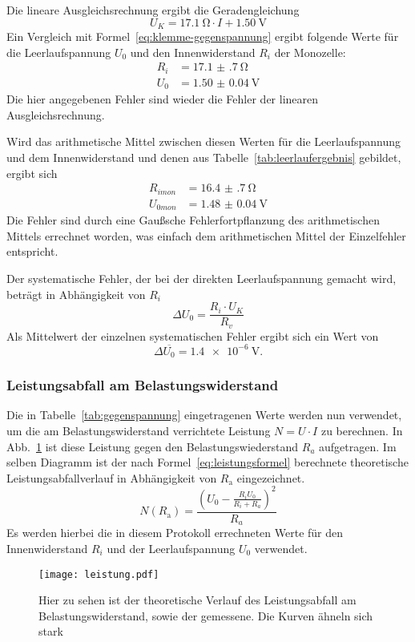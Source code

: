 Die lineare Ausgleichsrechnung ergibt die Geradengleichung
\begin{equation}
U_{K} = \SI{17.1}{\ohm}\cdot I + \SI{1.50}{\volt}
\end{equation}
Ein Vergleich mit Formel~\eqref{eq:klemme-gegenspannung} ergibt folgende 
Werte für die Leerlaufspannung $U_{0}$ und den 
Innenwiderstand $R_{i}$ der Monozelle:
\begin{align*}
R_{i}&=\SI{17.1(7)}{\ohm}\\
U_{0}&=\SI{1.50(4)}{\volt}
\end{align*}
Die hier angegebenen Fehler sind wieder die Fehler der linearen 
Ausgleichsrechnung.

Wird das arithmetische Mittel zwischen diesen 
Werten für die Leerlaufspannung und dem Innenwiderstand 
und denen aus Tabelle~\ref{tab:leerlaufergebnis} gebildet, 
ergibt sich 
\begin{align*}
R_{imon}&=\SI{16.4(7)}{\ohm}\\
U_{0mon}&=\SI{1.48(4)}{\volt}
\end{align*}
Die Fehler sind durch eine Gaußsche Fehlerfortpflanzung des arithmetischen 
Mittels errechnet worden, was einfach dem arithmetischen Mittel der 
Einzelfehler entspricht.


Der systematische Fehler, der bei der direkten Leerlaufspannung 
gemacht wird, beträgt in Abhängigkeit von $R_{i}$
\begin{equation*}
\Delta U_{0} = \frac{R_{i}\cdot U_{K}}{R_{v}}
\end{equation*}
Als Mittelwert der einzelnen systematischen Fehler ergibt sich ein 
Wert von 
\begin{equation*}
\Delta \overline{U_{0}} = \SI{1.4e-6}{\volt}.
\end{equation*}
%
\subsubsection{Leistungsabfall am Belastungswiderstand}
Die in Tabelle~\ref{tab:gegenspannung} eingetragenen Werte werden nun 
verwendet, um die am Belastungswiderstand verrichtete Leistung 
$N = U\cdot I$ zu berechnen. In Abb.~\ref{fig:leistung} ist diese Leistung 
gegen den Belastungswiederstand $R_{a}$ aufgetragen. 
Im selben Diagramm ist der nach Formel~\eqref{eq:leistungsformel} 
berechnete theoretische Leistungsabfallverlauf in Abhängigkeit von 
$R_\text{a}$ eingezeichnet.
\begin{equation}
\label{eq:leistungsformel}
N(R_\text{a})=\frac{(U_{0}-\frac{R_{i}U_{0}}{R_{i}+R_{a}})^2}{R_{a}}
\end{equation}
Es werden hierbei die in diesem Protokoll errechneten Werte für den 
Innenwiderstand $R_{i}$ und der Leerlaufspannung $U_{0}$ 
verwendet.

\begin{figure}[]
\centering
\texttt{[image: leistung.pdf]}
\caption{Hier zu sehen ist der theoretische Verlauf des Leistungsabfall 
am Belastungswiderstand, sowie der gemessene. Die Kurven ähneln sich 
stark}
\label{fig:leistung}
\end{figure}
\FloatBarrier